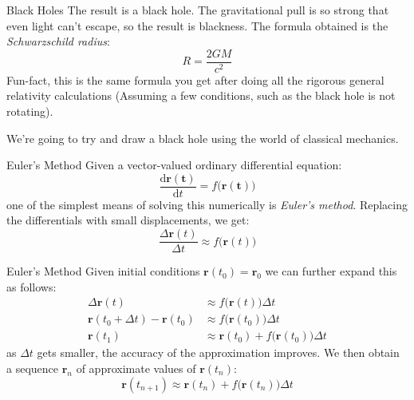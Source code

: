 \documentclass{beamer}
\begin{document}
    \begin{frame}{Black Holes}
        The result is a black hole. The gravitational pull is so strong that
        even light can't escape, so the result is blackness. The formula
        obtained is the \textit{Schwarzschild radius}:
        \begin{equation}
            R=\frac{2GM}{c^{2}}
        \end{equation}
        Fun-fact, this is the same formula you get after doing all the
        rigorous general relativity calculations
        (Assuming a few conditions, such as the black hole is not rotating).
        \par\hfill\par
        We're going to try and draw a black hole using the world of classical
        mechanics.
    \end{frame}
    \begin{frame}{Euler's Method}
        Given a vector-valued ordinary differential equation:
        \begin{equation}
            \frac{\textrm{d}\mathbf{r(t)}}{\textrm{d}t}
            =f\big(\mathbf{r(t)}\big)
        \end{equation}
        one of the simplest means of solving this numerically is
        \textit{Euler's method}. Replacing the differentials with small
        displacements, we get:
        \begin{equation}
            \frac{\Delta\mathbf{r}(t)}{\Delta{t}}
            \approx{f}\big(\mathbf{r}(t)\big)
        \end{equation}
    \end{frame}
    \begin{frame}{Euler's Method}
        Given initial conditions $\mathbf{r}(t_{0})=\mathbf{r}_{0}$ we can
        further expand this as follows:
        \begin{align}
            \Delta\mathbf{r}(t)&\approx{f}\big(\mathbf{r}(t)\big)\Delta{t}\\
            \mathbf{r}(t_{0}+\Delta{t})-\mathbf{r}(t_{0})
            &\approx{f}\big(\mathbf{r}(t_{0})\big)\Delta{t}\\
            \mathbf{r}(t_{1})&\approx\mathbf{r}(t_{0})+
                f\big(\mathbf{r}(t_{0})\big)\Delta{t}
        \end{align}
        as $\Delta{t}$ gets smaller, the accuracy of the approximation improves.
        We then obtain a sequence $\mathbf{r}_{n}$ of approximate values of
        $\mathbf{r}(t_{n})$:
        \begin{equation}
            \mathbf{r}(t_{n+1})\approx\mathbf{r}(t_{n})+
                f\big(\mathbf{r}(t_{n})\big)\Delta{t}
        \end{equation}
    \end{frame}
\end{document}
